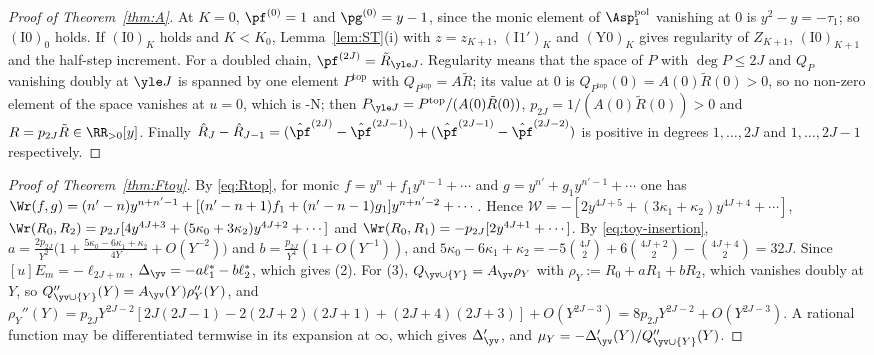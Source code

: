 \begin{proof}[Proof of Theorem~\textup{\ref{thm:A}}]
At $K=0$, $\pf^{(0)}=1$ and $\pg^{(0)}=y-1$, since the monic element of $\Asp^{\mathrm{pol}}_1$ vanishing at $0$ is
$y^2-y=-\tau_1$; so $(\mathrm{I0})_0$ holds. If $(\mathrm{I0})_K$ holds and $K<K_0$, Lemma~\ref{lem:ST}(i) with
$z=z_{K+1}$, $(\mathrm{I1}')_K$ and $(\mathrm{Y0})_K$ gives regularity of $Z_{K+1}$, $(\mathrm{I0})_{K+1}$ and the
half-step increment. For a doubled chain, $\pf^{(2J)}=\tilde R_{\yle J}$. Regularity means that the space of $P$ with
$\deg P\le2J$ and $Q_P$ vanishing doubly at $\yle J$ is spanned by one element $P^{\mathrm{top}}$ with
$Q_{P^{\mathrm{top}}}=A\tilde R$; its value at $0$ is $Q_{P^{\mathrm{top}}}(0)=A(0)\tilde R(0)>0$, so no non-zero
element of the space vanishes at $u=0$, which is \hyp{N}; then $P_{\yle J}=P^{\mathrm{top}}/(A(0)\tilde R(0))$,
$p_{2J}=1/(A(0)\tilde R(0))>0$ and $R=p_{2J}\tilde R\in\RR_{>0}[y]$. Finally
$\hat R_J-\hat R_{J-1}=(\hat{\pf}^{(2J)}-\hat{\pf}^{(2J-1)})+(\hat{\pf}^{(2J-1)}-\hat{\pf}^{(2J-2)})$ is positive in degrees
$1,\dots,2J$ and $1,\dots,2J-1$ respectively.
\end{proof}

\begin{proof}[Proof of Theorem~\textup{\ref{thm:Ftoy}}]
By \eqref{eq:Rtop}, for monic $f=y^n+f_1y^{n-1}+\cdots$ and $g=y^{n'}+g_1y^{n'-1}+\cdots$ one has
$\Wr(f,g)=(n'-n)y^{n+n'-1}+[(n'-n+1)f_1+(n'-n-1)g_1]y^{n+n'-2}+\cdots$. Hence
$\mathcal W=-[2y^{4J+5}+(3\kappa_1+\kappa_2)y^{4J+4}+\cdots]$, $\Wr(R_0,R_2)=p_{2J}[4y^{4J+3}+(5\kappa_0+3\kappa_2)y^{4J+2}+\cdots]$
and $\Wr(R_0,R_1)=-p_{2J}[2y^{4J+1}+\cdots]$. By \eqref{eq:toy-insertion},
$a=\frac{2p_{2J}}{Y^2}\bigl(1+\frac{5\kappa_0-6\kappa_1+\kappa_2}{4Y}+O(Y^{-2})\bigr)$ and
$b=\frac{p_{2J}}{Y^4}(1+O(Y^{-1}))$, and $5\kappa_0-6\kappa_1+\kappa_2=-5\binom{4J}2+6\binom{4J+2}2-\binom{4J+4}2=32J$.
Since $[u]E_m=-\ell_{2J+m}$, $\Delta_{\yv}=-a\ell_1^*-b\ell_2^*$, which gives (2). For (3),
$Q_{\yv\cup\{Y\}}=A_{\yv}\rho_Y$ with $\rho_Y:=R_0+aR_1+bR_2$, which vanishes doubly at $Y$, so
$Q''_{\yv\cup\{Y\}}(Y)=A_{\yv}(Y)\rho_Y''(Y)$, and
$\rho_Y''(Y)=p_{2J}Y^{2J-2}[2J(2J-1)-2(2J+2)(2J+1)+(2J+4)(2J+3)]+O(Y^{2J-3})=8p_{2J}Y^{2J-2}+O(Y^{2J-3})$. A rational
function may be differentiated termwise in its expansion at $\infty$, which gives $\Delta'_{\yv}$, and
$\mu_Y=-\Delta'_{\yv}(Y)/Q''_{\yv\cup\{Y\}}(Y)$.
\end{proof}


